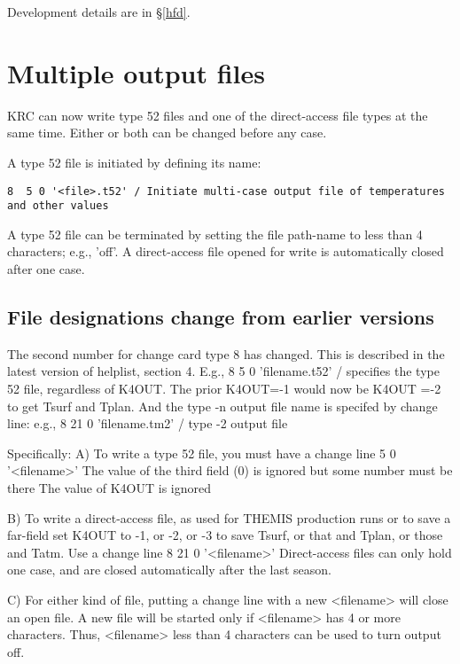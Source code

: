 \documentclass{article}
\begin{document}
Development details are in \S \ref{hfd}.

\section{Multiple output files}
KRC can now write type 52 files and one of the direct-access file types at the same time. Either or both can be changed before any case.

A type 52 file is initiated by defining its name: 
\vspace{-3.mm} 
\begin{verbatim}
8  5 0 '<file>.t52' / Initiate multi-case output file of temperatures and other values 
\end{verbatim} 

A type 52 file can be terminated by setting the file path-name to less than 4
characters; e.g., 'off'. A direct-access file opened for write is automatically
closed after one case.

\subsection{File designations change from earlier versions \label{filed}}

The second number for change card type 8 has changed. This is
   described in the latest version of helplist, section 4. E.g.,
   8 5 0 'filename.t52' / specifies the type 52 file, regardless of K4OUT.
   The prior K4OUT=-1  would now be K4OUT =-2 to get  Tsurf and Tplan.
   And the type -n output file name is specifed by change line: e.g.,
   8 21 0 'filename.tm2' / type -2 output file

Specifically:
A)  To write a type 52 file, you must have a change line
 5 0 '<filename>'
 \qi The value of the third field (0) is ignored but some number must be there
    The value of K4OUT is ignored

B) To write a direct-access file, as used for THEMIS production runs or to save a far-field
\qi set K4OUT to -1, or -2, or -3 to save Tsurf, or that and Tplan, or those and Tatm.
\qi Use a change line \hspace{1cm}      8 21 0 '<filename>'
\qi  Direct-access files can only hold one case, and are closed automatically after the last season.

C) For either kind of file, putting a change line with a new <filename>  will close an open file.
\qi     A new file will be started only if <filename> has 4 or more characters.
 \qi  Thus,  <filename> less than 4 characters can be used to turn output off.
\end{document}
